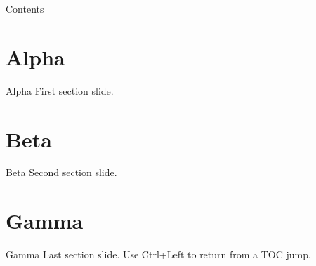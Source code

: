 \documentclass{beamer}
\begin{document}
\begin{frame}{Contents}
\tableofcontents
\end{frame}

\section{Alpha}
\begin{frame}{Alpha}
First section slide.
\end{frame}

\section{Beta}
\begin{frame}{Beta}
Second section slide.
\end{frame}

\section{Gamma}
\begin{frame}{Gamma}
Last section slide. Use Ctrl+Left to return from a TOC jump.
\end{frame}
\end{document}
